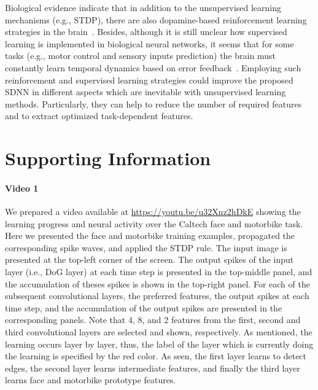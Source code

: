 \documentclass[preprint,5p,12pt,twocolumn]{article}
\begin{document}
Biological evidence indicate that in addition to the unsupervised learning mechanisms (e.g., STDP), there are also dopamine-based reinforcement learning strategies in the brain~\cite{pignatelli2015role}. Besides, although it is still unclear how supervised learning is implemented in biological neural networks,  it seems that for some tasks (e.g., motor control and sensory inputs prediction) the brain must constantly learn temporal dynamics based on error feedback~\cite{doya2000complementary}. Employing such reinforcement and supervised learning strategies could improve the proposed SDNN in different aspects which are inevitable with unsupervised learning methods. Particularly, they can help to reduce the number of required features and to extract optimized task-dependent features.


\section*{Supporting Information}


\paragraph*{Video 1}
\label{S1_Video}
We prepared a video available at \url{https://youtu.be/u32Xnz2hDkE} showing the learning progress and neural activity over the Caltech face and motorbike task. Here we presented the face and motorbike training examples,
propagated the corresponding spike waves, and applied the STDP
rule. The input image is presented at the top-left corner of the screen. The output spikes of the input layer (i.e., DoG layer) at each time step is presented in the top-middle panel, and the accumulation of theses spikes is shown in the top-right panel. For each of the subsequent convolutional layers, the preferred features, the output spikes at each time step, and the accumulation of the output spikes are presented in the corresponding panels. Note that 4, 8, and 2 features from the first, second and third convolutional layers are selected and shown, respectively. As mentioned, the learning occurs layer by layer, thus, the label of the layer which is currently doing the learning is specified by the red color. As seen, the first layer learns to detect edges, the second layer learns intermediate features, and finally the third layer learns face and motorbike prototype features.
\end{document}
